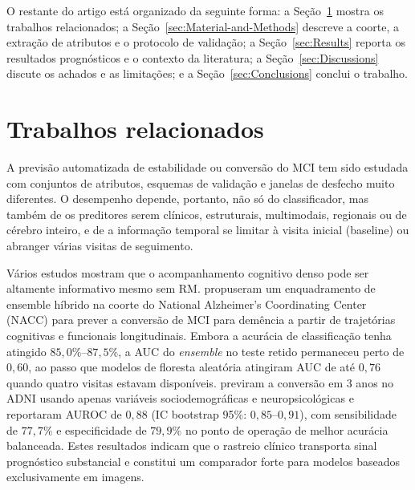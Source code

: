 \documentclass[review]{elsarticle}
\begin{document}
	O restante do artigo está organizado da seguinte forma: a Seção~\ref{sec:Related-Works} mostra os trabalhos relacionados; a Seção~\ref{sec:Material-and-Methods} descreve a coorte, a extração de atributos e o protocolo de validação; a Seção~\ref{sec:Results} reporta os resultados prognósticos e o contexto da literatura; a Seção~\ref{sec:Discussions} discute os achados e as limitações; e a Seção~\ref{sec:Conclusions} conclui o trabalho.
	
	
	\section{Trabalhos relacionados}\label{sec:Related-Works}
	
	A previsão automatizada de estabilidade ou conversão do MCI tem sido estudada com conjuntos de atributos, esquemas de validação e janelas de desfecho muito diferentes. O desempenho depende, portanto, não só do classificador, mas também de os preditores serem clínicos, estruturais, multimodais, regionais ou de cérebro inteiro, e de a informação temporal se limitar à visita inicial (baseline) ou abranger várias visitas de seguimento.
	
	Vários estudos mostram que o acompanhamento cognitivo denso pode ser altamente informativo mesmo sem RM. \citet{bucholc-2023} propuseram um enquadramento de ensemble híbrido na coorte do National Alzheimer's Coordinating Center (NACC) para prever a conversão de MCI para demência a partir de trajetórias cognitivas e funcionais longitudinais. Embora a acurácia de classificação tenha atingido $85,0\%$--$87,5\%$, a AUC do \emph{ensemble} no teste retido permaneceu perto de $0,60$, ao passo que modelos de floresta aleatória atingiram AUC de até $0,76$ quando quatro visitas estavam disponíveis. \citet{grassi-2019} previram a conversão em 3 anos no ADNI usando apenas variáveis sociodemográficas e neuropsicológicas e reportaram AUROC de $0,88$ (IC bootstrap 95\%: $0,85$--$0,91$), com sensibilidade de $77,7\%$ e especificidade de $79,9\%$ no ponto de operação de melhor acurácia balanceada. Estes resultados indicam que o rastreio clínico transporta sinal prognóstico substancial e constitui um comparador forte para modelos baseados exclusivamente em imagens.
	
\end{document}
